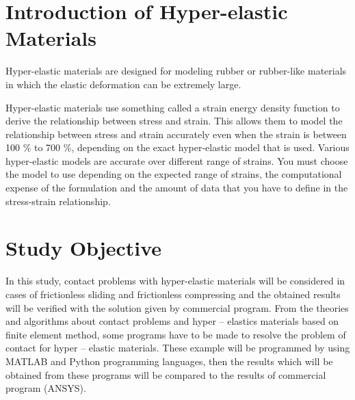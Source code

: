 
\section{ Introduction of Hyper-elastic Materials}
Hyper-elastic materials are designed for modeling rubber or rubber-like materials in which the elastic deformation can be extremely large. 

Hyper-elastic materials use something called a strain energy density function to derive the relationship between stress and strain. This allows them to model the relationship between stress and strain accurately even when the strain is between 100 \% to 700 \%, depending on the exact hyper-elastic model that is used.
Various hyper-elastic models are accurate over different range of strains. You must choose the model to use depending on the expected range of strains, the computational expense of the formulation and the amount of data that you have to define in the stress-strain relationship.

\section{Study Objective}
In this study, contact problems with hyper-elastic materials will be considered in cases of frictionless sliding and frictionless compressing and the obtained results will be verified with the solution given by commercial program. From the theories and algorithms about contact problems and hyper – elastics materials based on finite element method, some
programs have to be made to resolve the problem of contact for hyper – elastic materials. These example will be programmed by using MATLAB and Python programming
languages, then the results which will be obtained from these programs will be compared to the results of commercial program (ANSYS).


